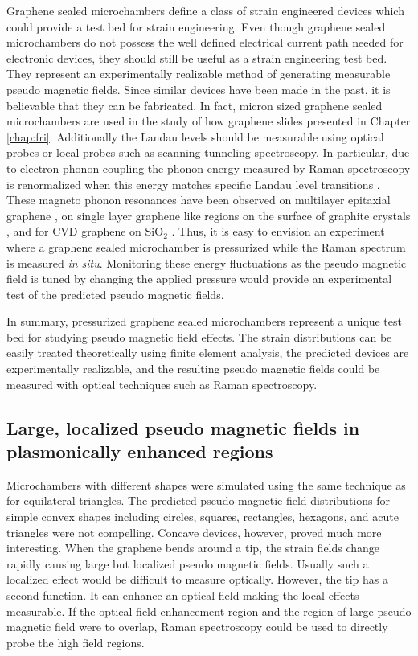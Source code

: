 Graphene sealed microchambers define a class of strain engineered devices which could provide a test bed for strain engineering.
Even though graphene sealed microchambers do not possess the well defined electrical current path needed for electronic devices, they should still be useful as a strain engineering test bed.
They represent an experimentally realizable method of generating measurable pseudo magnetic fields.
Since similar devices have been made in the past, it is believable that they can be fabricated.
In fact, micron sized graphene sealed microchambers are used in the study of how graphene slides presented in Chapter \ref{chap:fri}.
Additionally the Landau levels should be measurable using optical probes or local probes such as scanning tunneling spectroscopy.
In particular, due to electron phonon coupling the phonon energy measured by Raman spectroscopy is renormalized when this energy matches specific Landau level transitions \cite{Goerbig2011}.
These magneto phonon resonances have been observed on multilayer epitaxial graphene \cite{Faugeras2009}, on single layer graphene like regions on the surface of graphite crystals \cite{Faugeras2011}, and for CVD graphene on SiO$_2$ \cite{Kim2013}.
Thus, it is easy to envision an experiment where a graphene sealed microchamber is pressurized while the Raman spectrum is measured \emph{in situ}.
Monitoring these energy fluctuations as the pseudo magnetic field is tuned by changing the applied pressure would provide an experimental test of the predicted pseudo magnetic fields.

In summary, pressurized graphene sealed microchambers represent a unique test bed for studying pseudo magnetic field effects.
The strain distributions can be easily treated theoretically using finite element analysis, the predicted devices are experimentally realizable, and the resulting pseudo magnetic fields could be measured with optical techniques such as Raman spectroscopy.

\subsection{Large, localized pseudo magnetic fields in plasmonically enhanced regions}
Microchambers with different shapes were simulated using the same technique as for equilateral triangles.
The predicted pseudo magnetic field distributions for simple convex shapes including circles, squares, rectangles, hexagons, and acute triangles were not compelling.
Concave devices, however, proved much more interesting.
When the graphene bends around a tip, the strain fields change rapidly causing large but localized pseudo magnetic fields.
Usually such a localized effect would be difficult to measure optically.
However, the tip has a second function.
It can enhance an optical field making the local effects measurable.
If the optical field enhancement region and the region of large pseudo magnetic field were to overlap, Raman spectroscopy could be used to directly probe the high field regions. 


